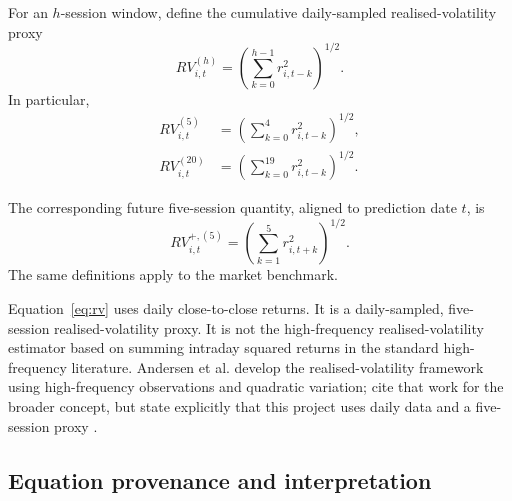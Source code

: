 \documentclass[11pt,a4paper]{article}
\begin{document}
For an $h$-session window, define the cumulative daily-sampled realised-volatility proxy
\begin{equation}
  RV_{i,t}^{(h)}=
  \left(\sum_{k=0}^{h-1}r_{i,t-k}^{2}\right)^{1/2}.
  \label{eq:rv}
\end{equation}
In particular,
\begin{align}
  RV_{i,t}^{(5)} &= \left(\sum_{k=0}^{4}r_{i,t-k}^{2}\right)^{1/2},\\
  RV_{i,t}^{(20)} &= \left(\sum_{k=0}^{19}r_{i,t-k}^{2}\right)^{1/2}.
\end{align}

The corresponding future five-session quantity, aligned to prediction date $t$, is
\begin{equation}
  RV_{i,t}^{+, (5)}=
  \left(\sum_{k=1}^{5}r_{i,t+k}^{2}\right)^{1/2}.
  \label{eq:future-rv}
\end{equation}
The same definitions apply to the market benchmark.

\begin{warningbox}
Equation~\eqref{eq:rv} uses daily close-to-close returns. It is a daily-sampled, five-session realised-volatility proxy. It is not the high-frequency realised-volatility estimator based on summing intraday squared returns in the standard high-frequency literature. Andersen et al. develop the realised-volatility framework using high-frequency observations and quadratic variation; cite that work for the broader concept, but state explicitly that this project uses daily data and a five-session proxy \cite{Andersen2003}.
\end{warningbox}

\subsection{Equation provenance and interpretation}
\end{document}
